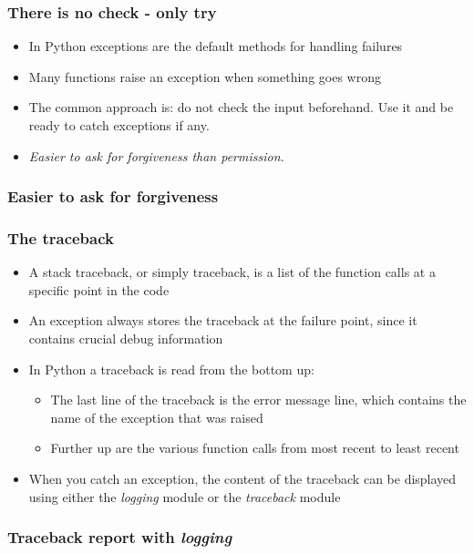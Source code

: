 \documentclass[9pt]{beamer}
\begin{document}
\begin{frame}
  \frametitle{There is no check - only try}
  \begin{itemize}
    \item In Python exceptions are the default methods for handling failures
    \smallskip
    \item Many functions raise an exception when something goes wrong
    \smallskip
    \item The common approach is: do not check the input beforehand. Use it and
          be ready to catch exceptions if any.
    \smallskip
    \item \textit{Easier to ask for forgiveness than permission.} 
  \end{itemize}
\end{frame}


\begin{frame}
  \frametitle{Easier to ask for forgiveness}
  
\end{frame}


\begin{frame}
  \frametitle{The traceback}
  \begin{itemize}
    \item A \alert{stack traceback}, or simply traceback, is a list of the
          function calls at a specific point in the code
    \smallskip
    \item An exception always stores the traceback at the failure point, since
          it contains crucial debug information 
    \smallskip
    \item In Python a traceback is read from the bottom up:
    \begin{itemize}
    \smallskip
    \item The last line of the traceback is the error message line, which
          contains the name of the exception that was raised
    \smallskip
    \item Further up are the various function calls from most
          recent to least recent
    \end{itemize}
    \medskip
    \item When you catch an exception, the content of the traceback can be
          displayed using either the \emph{logging} module or the
          \emph{traceback} module
  \end{itemize}
\end{frame}


\begin{frame}
  \frametitle{Traceback report with \emph{logging}}
  
\end{frame}
\end{document}
